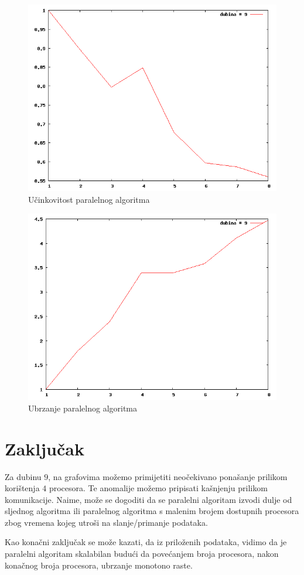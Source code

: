\documentclass[11pt]{article}
\begin{document}
\begin{figure}[!htb]	
	\centering
	\includegraphics[width=1\textwidth]{E.png}
	\caption{Učinkovitost paralelnog algoritma}
\end{figure}

\clearpage

\begin{figure}[!htb]	
	\centering
	\includegraphics[width=1\textwidth]{S.png}
	\caption{Ubrzanje paralelnog algoritma}
\end{figure}

\section{Zaključak}

Za dubinu $9$, na grafovima možemo primijetiti neočekivano ponašanje prilikom korištenja $4$ procesora. Te anomalije možemo pripisati kašnjenju prilikom komunikacije. Naime, može se dogoditi da se paralelni algoritam izvodi dulje od sljednog algoritma ili paralelnog algoritma s malenim brojem dostupnih procesora zbog vremena kojeg utroši na slanje/primanje podataka.

Kao konačni zaključak se može kazati, da iz priloženih podataka, vidimo da je paralelni algoritam skalabilan budući da povećanjem broja procesora, nakon konačnog broja procesora, ubrzanje monotono raste.
\end{document}
